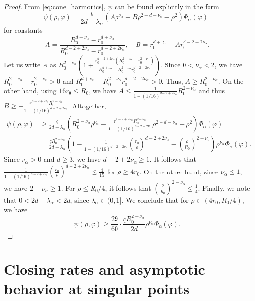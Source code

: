 \documentclass[11pt]{amsart}
\numberwithin{equation}{section}
\numberwithin{figure}{section}
\theoremstyle{plain}
\theoremstyle{definition}
\theoremstyle{remark}
\theoremstyle{plain}
\begin{document}
\begin{proof}
    From \eqref{eq:cone_harmonics}, $\psi$ can be found explicitly in the form
    \[ \psi(\rho, \varphi) = \frac{\underline{c}}{2d-\lambda_\alpha}(A\rho^{\nu_\alpha} + B\rho^{2-d - \nu_\alpha} - \rho^2)\Phi_\alpha(\varphi), \]
    for constants
    \[ A = \frac{R_0^{d+\nu_\alpha} - r_0^{d+\nu_\alpha}}{R_0^{d-2+2\nu_\alpha}- r_0^{d-2+2\nu_\alpha}}, \quad B = r_0^{d + \nu_\alpha} - Ar_0^{d-2+2\nu_\alpha}. \]
    Let us write $A$ as $R_0^{2-\nu_\alpha}\left(1 + \frac{r_0^{d-2+2\nu_\alpha}(R_0^{2-\nu_\alpha}- r_0^{2-\nu_\alpha})}{R_0^{d+\nu_\alpha}- R_0^{2-\nu_\alpha}r_0^{d-2+2\nu_\alpha}}\right)$. Since $0 < \nu_\alpha < 2$, we have $R_0^{2-\nu_\alpha} - r_0^{2-\nu_\alpha} > 0$ and $R_0^{d+\nu_\alpha}- R_0^{2-\nu_\alpha}r_0^{d-2+2\nu_\alpha} > 0$. Thus, $A \geq R_0^{2-\nu_\alpha}$. On the other hand, using  $16r_0\leq R_0$,  we have $A \leq \frac{1}{1- (1/16)^{d-2+2\nu_\alpha}}R_0^{2-\nu_\alpha}$ and thus $B \geq -\frac{r_0^{d-2+2\nu_\alpha}R_0^{2-\nu_\alpha}}{1- (1/16)^{d-2+2\nu_\alpha}}$. Altogether,
    \[ \begin{aligned}
        \psi(\rho, \varphi) &\geq \frac{\underline{c}}{2d-\lambda_\alpha}\left(R_0^{2-\nu_\alpha}\rho^{\nu_\alpha} - \frac{r_0^{d-2+2\nu_\alpha}R_0^{2-\nu_\alpha}}{1- (1/16)^{d-2+2\nu_\alpha}}\rho^{2-d-\nu_\alpha} - \rho^2\right)\Phi_\alpha(\varphi)
        \\&= \frac{\underline{c}R_0^{2-\nu_\alpha}}{2d-\lambda_\alpha}\left(1 - \frac{1}{1- (1/16)^{d-2+2\nu_\alpha}}\left(\frac{r_0}{\rho}\right)^{d-2 + 2\nu_\alpha} - \left(\frac{\rho}{R_0}\right)^{2-\nu_\alpha}\right)\rho^{\nu_\alpha}\Phi_\alpha(\varphi).
    \end{aligned} \]
    Since $\nu_\alpha > 0$ and $d\geq 3$, we have $d-2+2\nu_\alpha \geq 1$. It follows that $\frac{1}{1- (1/16)^{d-2+2\nu_\alpha}}\left(\frac{r_0}{\rho}\right)^{d-2 + 2\nu_\alpha} \leq \frac{4}{15}$ for $\rho \geq 4r_0$. On the other hand, since $\nu_\alpha \leq 1$, we have $2-\nu_\alpha \geq 1$. For $\rho \leq R_0/4$, it follows that $\left(\frac{\rho}{R_0}\right)^{2-\nu_\alpha} \leq \frac{1}{4}$. Finally, we note that $0 < 2d-\lambda_\alpha < 2d$, since $\lambda_\alpha\in (0,1]$. We conclude that for $\rho\in (4r_0, R_0/4)$, we have
    \[ \psi(\rho, \varphi) \geq \frac{29}{60}\cdot \frac{\underline{c}R_0^{2-\nu_\alpha}}{2d}\rho^{\nu_\alpha}\Phi_\alpha(\varphi). \]
\end{proof}

\section{Closing rates and asymptotic behavior at singular points}\label{sec:closing-rates}
\end{document}
